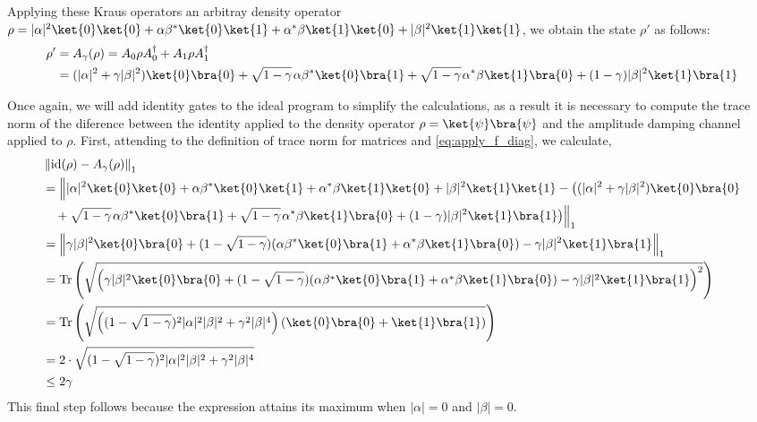 \begin{example}
Applying these Kraus operators an arbitray density operator $\rho=|\alpha|^{2} \ket{0} \ket{0} + \alpha \beta^{*} \ket{0} \ket{1} + \alpha^{*} \beta \ket{1} \ket{0} + |\beta|^{2} \ket{1} \ket{1}$, we obtain the state $\rho'$ as follows:
\begin{align*}
     \rho' & = A_\gamma(\rho) =  A_{0} \rho A_{0}^{\dag} + A_{1} \rho A_{1}^{\dag} \\
     & = (|\alpha|^{2} + \gamma |\beta|^{2}) \ket{0}\bra{0} + \sqrt{1-\gamma} \hspace{1pt} \alpha \beta^{*} \ket{0}\bra{1} + \sqrt{1-\gamma} \hspace{1pt} \alpha^{*} \beta \ket{1}\bra{0} + (1-\gamma) |\beta|^{2} \ket{1}\bra{1}
\end{align*}

Once again, we will add identity gates to the ideal program to simplify the calculations, as a result it is necessary to compute the trace norm of the diference between the identity applied to the density operator $\rho = \ket{\psi} \bra{\psi}$ and the amplitude damping channel applied to $\rho$.
First, attending to the definition of trace norm for matrices and \autoref{eq:apply_f_diag}, we calculate, 
\begin{align*}
  & \tracenorm{ \id(\rho) - A_{\gamma}(\rho)} \\
  & =    \Big\lVert  |\alpha|^{2} \ket{0} \ket{0} + \alpha \beta^{*} \ket{0} \ket{1} + \alpha^{*} \beta \ket{1} \ket{0} + |\beta|^{2} \ket{1} \ket{1}  - \big((|\alpha|^{2} + \gamma |\beta|^{2}) \ket{0}\bra{0} \\ 
  & \hspace{10pt}  +  \sqrt{1-\gamma} \hspace{1pt} \alpha \beta^{*} \ket{0}\bra{1} + \sqrt{1-\gamma} \hspace{1pt} \alpha^{*} \beta \ket{1}\bra{0} + (1-\gamma) |\beta|^{2} \ket{1}\bra{1}\big) \Big\rVert_1 \\
   & = \tracenorm{\gamma |\beta|^{2} \ket{0} \bra{0} + (1-\sqrt{1-\gamma}) (\alpha \beta^{*} \ket{0} \bra{1} + \alpha^{*} \beta \ket{1} \bra{0}) - \gamma |\beta|^{2} \ket{1} \bra{1}} \\
   & = \tr \left( \sqrt{\left( \gamma |\beta|^{2} \ket{0} \bra{0} + (1-\sqrt{1-\gamma}) (\alpha \beta^{*} \ket{0} \bra{1} + \alpha^{*} \beta \ket{1} \bra{0}) - \gamma |\beta|^{2} \ket{1} \bra{1}  \right)^2}\right) \\
   & = \tr \left( \sqrt{\left( (1-\sqrt{1-\gamma})^{2} |\alpha|^{2}|\beta|^{2} + \gamma^{2} |\beta|^{4} \right) (\ket{0} \bra{0} + \ket{1} \bra{1} ) } \right) \\
   & = 2 \cdot \sqrt{  (1-\sqrt{1-\gamma})^{2} |\alpha|^{2}|\beta|^{2} + \gamma^{2} |\beta|^{4}} \\
   & \leq 2 \gamma
\end{align*}
This final step follows because the expression attains its maximum when 
$|\alpha|=0 $ and $|\beta|=0.$


\end{example}
